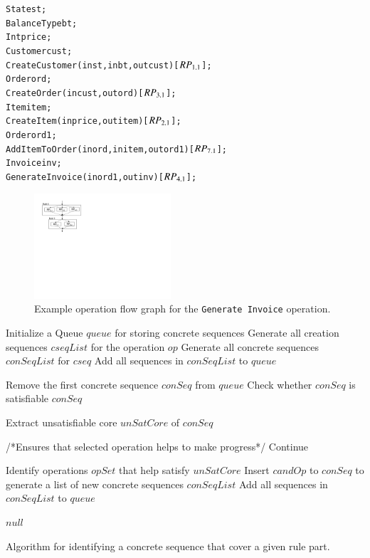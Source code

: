 \vspace*{-5pt}
{\small
\begin{alltt}
  State st;
  BalanceType bt;
  Int price;
  Customer cust;
  CreateCustomer(in st,in bt, out cust) [\(RP\sb{1.1}\)];
  Order ord;
  CreateOrder(in cust, out ord) [\(RP\sb{3.1}\)];	
  Item item;
  CreateItem(in price, out item) [\(RP\sb{2.1}\)];
  Order ord1;
  AddItemToOrder(in ord,in item, out ord1) [\(RP\sb{7.1}\)];
  Invoice inv;
  GenerateInvoice(in ord1, out inv) [\(RP\sb{4.1}\)]; 
\end{alltt}
}
\vspace*{-5pt}

\begin{figure}
\centering
\includegraphics[trim=48 390 520 38,clip,width=2in]{figs/cfg-example.pdf}
\caption{Example operation flow graph for the {\tt Generate Invoice} operation.}
\label{fig:cfg}
\end{figure}

\begin{algorithm}[t]
\footnotesize
\SetAlgoVlined
{}
\BlankLine

\nl Initialize a Queue $queue$ for storing concrete sequences\;
\nl Generate all creation sequences $cseqList$ for the operation $op$\;
\nl {}
{
		\nl Generate all concrete sequences $conSeqList$ for $cseq$\;
		\nl Add all sequences in $conSeqList$ to $queue$\;
} 

\nl {}
{
		\nl Remove the first concrete sequence $conSeq$ from $queue$\;
		\nl Check whether $conSeq$ is satisfiable\;
		\nl {}
		{
				\Return $conSeq$ \;
		}
		
		\nl Extract unsatisfiable core $unSatCore$ of $conSeq$\;
		
		/*Ensures that selected operation helps to make progress*/
		\nl {}
		{
				Continue\;
		}
		
		\nl Identify operations $opSet$ that help satisfy $unSatCore$\;		
		\nl {}
		{
			\nl Insert $candOp$ to $conSeq$ to generate a list of new concrete sequences $conSeqList$\;
			\nl Add all sequences in $conSeqList$ to $queue$\;			
		}
}

\Return $null$\;
		
\caption{\label{alg:guidedsearch} Algorithm for
  identifying a concrete sequence that cover a given rule part.}
\end{algorithm}



